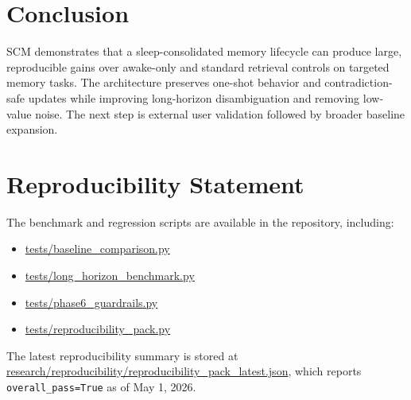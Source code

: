\documentclass[11pt,a4paper]{article}
\begin{document}
\section{Conclusion}
SCM demonstrates that a sleep-consolidated memory lifecycle can produce large, reproducible gains over awake-only and standard retrieval controls on targeted memory tasks. The architecture preserves one-shot behavior and contradiction-safe updates while improving long-horizon disambiguation and removing low-value noise. The next step is external user validation followed by broader baseline expansion.

\section*{Reproducibility Statement}
The benchmark and regression scripts are available in the repository, including:
\begin{itemize}[leftmargin=1.5em]
    \item \url{tests/baseline_comparison.py}
    \item \url{tests/long_horizon_benchmark.py}
    \item \url{tests/phase6_guardrails.py}
    \item \url{tests/reproducibility_pack.py}
\end{itemize}
The latest reproducibility summary is stored at \url{research/reproducibility/reproducibility_pack_latest.json}, which reports \texttt{overall\_pass=True} as of May 1, 2026.



\end{document}
